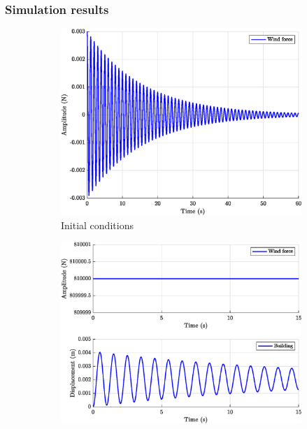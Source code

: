 \subsubsection{Simulation results}
\begin{figure}[H]
    \centering
    \begin{subfigure}{0.495\textwidth}
        \includegraphics[width=\textwidth]{resources/eps/initial-condition.eps}
        \caption{Initial conditions}
        \label{fig:q4.initial}
    \end{subfigure}
    \begin{subfigure}{0.495\textwidth}
        \includegraphics[width=\textwidth]{resources/eps/constant-wind.eps}

\end{subfigure}
\end{figure}

